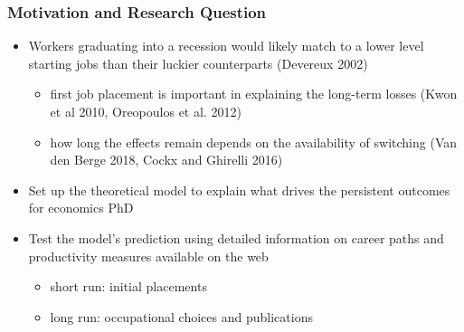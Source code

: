 \documentclass[11pt]{beamer}
\begin{document}
\begin{frame}[label = motivation]
	\frametitle{Motivation and Research Question} 
	\begin{itemize}

			\item Workers graduating into a recession would likely match to a lower level starting jobs than their luckier counterparts (Devereux 2002)
		\begin{itemize}
			\item first job placement is important in explaining the long-term losses (Kwon et al 2010, Oreopoulos et al. 2012)
			\item how long the effects remain depends on the availability of switching (Van den Berge 2018, Cockx and Ghirelli 2016)
		\end{itemize}
		

		\vspace{2mm}
	\item Set up the theoretical model to explain what drives the persistent outcomes for economics PhD
		\vspace{1 mm}
	\item Test the model’s prediction using detailed information on career paths and productivity measures  available on the web
			\begin{itemize}
		\item short run: initial placements
		\item long run: occupational choices and publications 
	\end{itemize}
%			
	
	\end{itemize}
\end{frame}
\end{document}
